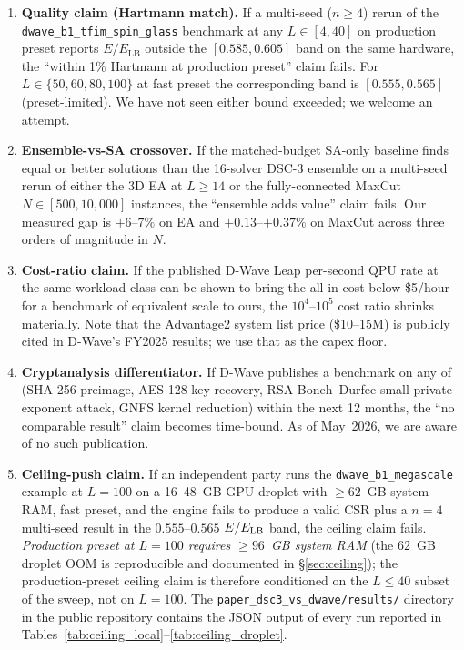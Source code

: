 \documentclass[11pt,a4paper]{article}
\begin{document}
\begin{enumerate}\itemsep0.15em
\item[\textbf{F1.}] \textbf{Quality claim (Hartmann match).} If a
  multi-seed ($n\!\ge\!4$) rerun of the
  \texttt{dwave\_b1\_tfim\_spin\_glass} benchmark at any
  $L\!\in\![4, 40]$ on production preset reports $E/E_{\mathrm{LB}}$
  outside the $[0.585, 0.605]$ band on the same hardware, the
  ``within 1\% Hartmann at production preset'' claim fails. For
  $L\!\in\!\{50, 60, 80, 100\}$ at fast preset the corresponding band
  is $[0.555, 0.565]$ (preset-limited). We have not seen either bound
  exceeded; we welcome an attempt.
\item[\textbf{F2.}] \textbf{Ensemble-vs-SA crossover.} If the
  matched-budget SA-only baseline finds equal or better solutions than
  the 16-solver DSC-3 ensemble on a multi-seed rerun of either the
  3D EA at $L\!\ge\!14$ or the fully-connected MaxCut
  $N\!\in\![500, 10{,}000]$ instances, the
  ``ensemble adds value'' claim fails. Our measured gap is
  $+6$--$7\%$ on EA and $+0.13$--$+0.37\%$ on MaxCut across three
  orders of magnitude in $N$.
\item[\textbf{F3.}] \textbf{Cost-ratio claim.} If the published D-Wave
  Leap per-second QPU rate at the same workload class can be shown to
  bring the all-in cost below \$5/hour for a benchmark of equivalent
  scale to ours, the $10^4$--$10^5$ cost ratio shrinks materially. Note
  that the Advantage2 system list price (\$10--15M) is publicly cited
  in D-Wave's FY2025 results; we use that as the capex floor.
\item[\textbf{F4.}] \textbf{Cryptanalysis differentiator.} If D-Wave
  publishes a benchmark on any of (SHA-256 preimage, AES-128 key
  recovery, RSA Boneh--Durfee small-private-exponent attack, GNFS
  kernel reduction) within the next 12 months, the
  ``no comparable result'' claim becomes time-bound. As of May~2026,
  we are aware of no such publication.
\item[\textbf{F5.}] \textbf{Ceiling-push claim.} If an independent
  party runs the \texttt{dwave\_b1\_megascale} example at $L\!=\!100$
  on a 16--48~GB GPU droplet with $\ge\!62$~GB system RAM, fast
  preset, and the engine fails to produce a valid CSR plus a
  $n\!=\!4$ multi-seed result in the $0.555$--$0.565$
  $E/E_{\rm LB}$ band, the ceiling claim fails. \emph{Production
  preset at $L\!=\!100$ requires $\ge\!96$~GB system RAM} (the 62~GB
  droplet OOM is reproducible and documented in
  \S\ref{sec:ceiling}); the production-preset ceiling claim is
  therefore conditioned on the $L\!\le\!40$ subset of the sweep, not
  on $L\!=\!100$. The \texttt{paper\_dsc3\_vs\_dwave/results/}
  directory in the public repository contains the JSON output of every
  run reported in Tables~\ref{tab:ceiling_local}--\ref{tab:ceiling_droplet}.
\end{enumerate}
\end{document}
